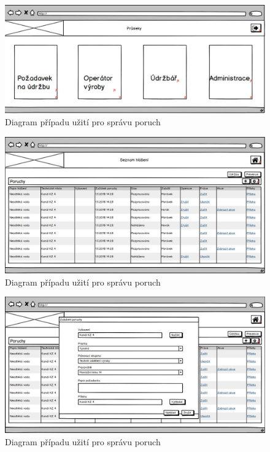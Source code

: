 \documentclass[thesis=M,czech]{FITthesis}[2012/06/26]
\begin{document}
\begin{figure}[H]
	\centering
	\includegraphics[width=1\textwidth]{images/bal_homepage}
	\caption{Diagram případu užití pro správu poruch}
	\label{img:uc_sprava_poruch}
\end{figure}


\begin{figure}[H]
	\centering
	\includegraphics[width=1\textwidth]{images/bal_poruchy_seznam}
	\caption{Diagram případu užití pro správu poruch}
	\label{img:uc_sprava_poruch}
\end{figure}

\begin{figure}[H]
	\centering
	\includegraphics[width=1\textwidth]{images/bal_poruchy_seznam_zalozeni_poruchy}
	\caption{Diagram případu užití pro správu poruch}
	\label{img:uc_sprava_poruch}
\end{figure}
\end{document}
